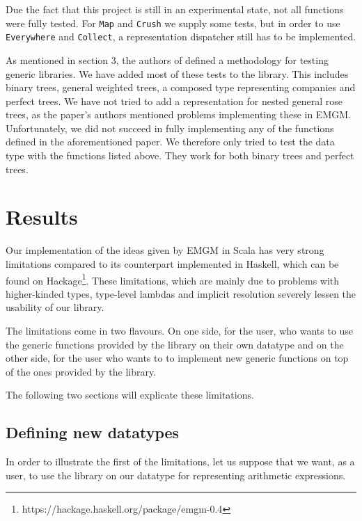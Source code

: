 \documentclass[a4paper]{article}
\begin{document}
Due the fact that this project is still in an experimental state, not all functions were fully tested. For \texttt{Map} and \texttt{Crush} we supply some tests, but in order to use \texttt{Everywhere} and \texttt{Collect}, a representation dispatcher still has to be implemented. 

As mentioned in section 3, the authors of\cite{rodriguez2008comparing} defined a methodology for testing generic libraries. We have added most of these tests to the library. This includes binary trees, general weighted trees, a composed type representing companies and perfect trees. We have not tried to add a representation for nested general rose trees, as the paper's authors mentioned problems implementing these in EMGM. Unfortunately, we did not succeed in fully implementing any of the functions defined in the aforementioned paper. We therefore only tried to test the data type with the functions listed above. They work for both binary trees and perfect trees.

\section{Results}

Our implementation of the ideas given by EMGM in Scala has very strong limitations compared to its counterpart implemented in Haskell, which can be found on Hackage\footnote{https://hackage.haskell.org/package/emgm-0.4}. These limitations, which are mainly due to problems with higher-kinded types, type-level lambdas and implicit resolution severely  lessen the usability of our library.

The limitations come in two flavours. On one side, for the user, who wants to use the generic functions provided by the library on their own datatype and on the other side, for the user who wants to to implement new generic functions on top of the ones provided by the library. %

The following two sections will explicate these limitations.

\subsection{Defining new datatypes}

In order to illustrate the first of the limitations, let us suppose that we want, as a user, to use the library on our datatype for representing arithmetic expressions.
\end{document}
